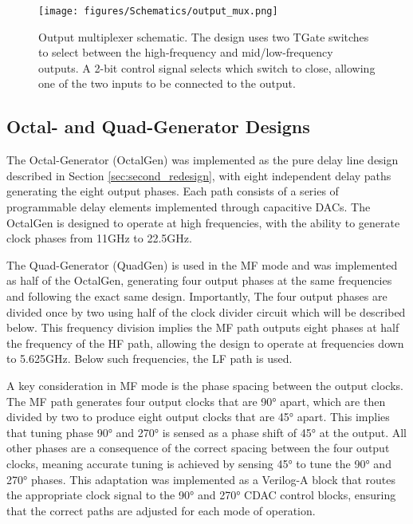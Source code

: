 \begin{figure}[H]
  \centering
  \texttt{[image: figures/Schematics/output\_mux.png]}
  \caption{Output multiplexer schematic. The design uses two TGate switches to select between the high-frequency and mid/low-frequency outputs. A 2-bit control signal selects which switch to close, allowing one of the two inputs to be connected to the output.}
  \label{fig:output_mux}
\end{figure}


\subsection{Octal- and Quad-Generator Designs}\label{sec:octal_quad_gen_design}

The Octal-Generator (OctalGen) was implemented as the pure delay line design described in Section \ref{sec:second_redesign}, with eight independent delay paths generating the eight output phases. Each path consists of a series of programmable delay elements implemented through capacitive DACs. The OctalGen is designed to operate at high frequencies, with the ability to generate clock phases from 11GHz to 22.5GHz. 

The Quad-Generator (QuadGen) is used in the MF mode and was implemented as half of the OctalGen, generating four output phases at the same frequencies and following the exact same design. Importantly, The four output phases are divided once by two using half of the clock divider circuit which will be described below. This frequency division implies the MF path outputs eight phases at half the frequency of the HF path, allowing the design to operate at frequencies down to 5.625GHz. Below such frequencies, the LF path is used.

A key consideration in MF mode is the phase spacing between the output clocks. The MF path generates four output clocks that are \ang{90} apart, which are then divided by two to produce eight output clocks that are \ang{45} apart. This implies that tuning phase \ang{90} and \ang{270} is sensed as a phase shift of \ang{45} at the output. All other phases are a consequence of the correct spacing between the four output clocks, meaning accurate tuning is achieved by sensing \ang{45} to tune the \ang{90} and \ang{270} phases. This adaptation was implemented as a Verilog-A block that routes the appropriate clock signal to the \ang{90} and \ang{270} CDAC control blocks, ensuring that the correct paths are adjusted for each mode of operation.

